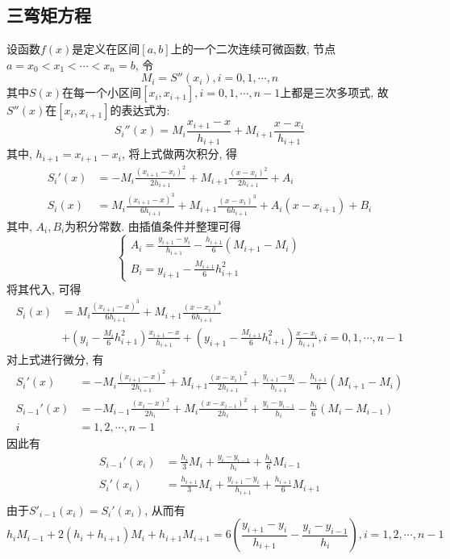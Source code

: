 \subsection{三弯矩方程}
设函数$f(x)$是定义在区间$[a,b]$上的一个二次连续可微函数, 节点$a=x_0<x_1<\cdots<x_n=b$, 令
\begin{equation*}
    M_i=S''(x_i), i=0,1,\cdots,n
\end{equation*}
其中$S(x)$在每一个小区间$[x_i,x_{i+1}],i=0,1,\cdots, n-1$上都是三次多项式, 故$S''(x)$在$[x_i,x_{i+1}]$的表达式为:
\begin{equation*}
    S_i''(x)=M_i\frac{x_{i+1}-x}{h_{i+1}}+M_{i+1}\frac{x-x_i}{h_{i+1}}
\end{equation*}
其中, $h_{i+1}=x_{i+1}-x_i$, 将上式做两次积分, 得
\begin{align*}
    S_i'(x)&=-M_i\frac{(x_{i+1}-x_i)^2}{2h_{i+1}}+M_{i+1}\frac{(x-x_i)^2}{2h_{i+1}}+A_i\\
    S_i(x)&=M_i\frac{(x_{i+1}-x)^3}{6h_{i+1}}+M_{i+1}\frac{(x-x_i)^3}{6h_{i+1}}+A_i(x-x_{i+1})+B_i
\end{align*}
其中, $A_i, B_i$为积分常数. 由插值条件并整理可得
\begin{equation*}
    \begin{cases}
        A_i=\frac{y_{i+1}-y_i}{h_{i+1}}-\frac{h_{i+1}}{6}(M_{i+1}-M_i)\\
        B_i=y_{i+1}-\frac{M_{i+1}}{6}h_{i+1}^2
    \end{cases}
\end{equation*}
将其代入, 可得
\begin{align*}
    S_i(x)&=M_i\frac{(x_{i+1}-x)^3}{6h_{i+1}}+M_{i+1}\frac{(x-x_i)^3}{6h_{i+1}}\\
    &+\left(y_i-\frac{M_i}{6}h_{i+1}^2\right)\frac{x_{i+1}-x}{h_{i+1}}+\left(y_{i+1}-\frac{M_{i+1}}{6}h_{i+1}^2\right)\frac{x-x_i}{h_{i+1}}, i=0,1,\cdots,n-1
\end{align*}
对上式进行微分, 有
\begin{align*}
    S_i'(x)&=-M_i\frac{(x_{i+1}-x)^2}{2h_{i+1}}+M_{i+1}\frac{(x-x_i)^2}{2h_{i+1}}+\frac{y_{i+1}-y_i}{h_{i+1}}-\frac{h_{i+1}}{6}(M_{i+1}-M_i)\\
    S_{i-1}'(x)&=-M_{i-1}\frac{(x_{i}-x)^2}{2h_{i}}+M_{i}\frac{(x-x_{i-1})^2}{2h_{i}}+\frac{y_{i}-y_{i-1}}{h_{i}}-\frac{h_{i}}{6}(M_{i}-M_{i-1})\\
    i&=1,2,\cdots,n-1
\end{align*}
因此有
\begin{align*}
    S_{i-1}'(x_i)&=\frac{h_i}{3}M_i+\frac{y_i-y_{i-1}}{h_i}+\frac{h_i}{6}M_{i-1}\\
    S_{i}'(x_i)&=\frac{h_{i+1}}{3}M_i+\frac{y_{i+1}-y_{i}}{h_{i+1}}+\frac{h_{i+1}}{6}M_{i+1}\\
\end{align*}
由于$S'_{i-1}(x_i)=S_i'(x_i)$, 从而有
\begin{equation*}
    h_iM_{i-1}+2(h_i+h_{i+1})M_i+h_{i+1}M_{i+1}=6\left(\frac{y_{i+1}-y_i}{h_{i+1}}-\frac{y_i-y_{i-1}}{h_i}\right), i=1,2,\cdots, n-1
\end{equation*}


